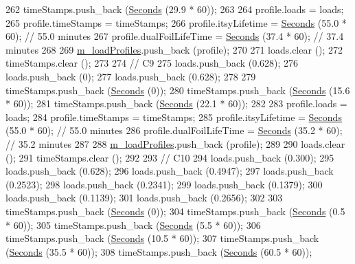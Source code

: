 \begin{DoxyCode}
262   timeStamps.push\_back (\hyperlink{group__timecivil_ga33c34b816f8ff6628e33d5c8e9713b9e}{Seconds} (29.9 * 60));
263 
264   profile.loads = loads;
265   profile.timeStamps = timeStamps;
266   profile.itsyLifetime = \hyperlink{group__timecivil_ga33c34b816f8ff6628e33d5c8e9713b9e}{Seconds} (55.0 * 60);     \textcolor{comment}{// 55.0 minutes}
267   profile.dualFoilLifeTime = \hyperlink{group__timecivil_ga33c34b816f8ff6628e33d5c8e9713b9e}{Seconds} (37.4 * 60); \textcolor{comment}{// 37.4 minutes}
268 
269   \hyperlink{classBatteryLifetimeTest_aee9ad324da18f58ee75689778580c3fb}{m\_loadProfiles}.push\_back (profile);
270 
271   loads.clear ();
272   timeStamps.clear ();
273 
274   \textcolor{comment}{// C9}
275   loads.push\_back (0.628);
276   loads.push\_back (0);
277   loads.push\_back (0.628);
278 
279   timeStamps.push\_back (\hyperlink{group__timecivil_ga33c34b816f8ff6628e33d5c8e9713b9e}{Seconds} (0));
280   timeStamps.push\_back (\hyperlink{group__timecivil_ga33c34b816f8ff6628e33d5c8e9713b9e}{Seconds} (15.6 * 60));
281   timeStamps.push\_back (\hyperlink{group__timecivil_ga33c34b816f8ff6628e33d5c8e9713b9e}{Seconds} (22.1 * 60));
282 
283   profile.loads = loads;
284   profile.timeStamps = timeStamps;
285   profile.itsyLifetime = \hyperlink{group__timecivil_ga33c34b816f8ff6628e33d5c8e9713b9e}{Seconds} (55.0 * 60);     \textcolor{comment}{// 55.0 minutes}
286   profile.dualFoilLifeTime = \hyperlink{group__timecivil_ga33c34b816f8ff6628e33d5c8e9713b9e}{Seconds} (35.2 * 60); \textcolor{comment}{// 35.2 minutes}
287 
288   \hyperlink{classBatteryLifetimeTest_aee9ad324da18f58ee75689778580c3fb}{m\_loadProfiles}.push\_back (profile);
289 
290   loads.clear ();
291   timeStamps.clear ();
292 
293   \textcolor{comment}{// C10}
294   loads.push\_back (0.300);
295   loads.push\_back (0.628);
296   loads.push\_back (0.4947);
297   loads.push\_back (0.2523);
298   loads.push\_back (0.2341);
299   loads.push\_back (0.1379);
300   loads.push\_back (0.1139);
301   loads.push\_back (0.2656);
302 
303   timeStamps.push\_back (\hyperlink{group__timecivil_ga33c34b816f8ff6628e33d5c8e9713b9e}{Seconds} (0));
304   timeStamps.push\_back (\hyperlink{group__timecivil_ga33c34b816f8ff6628e33d5c8e9713b9e}{Seconds} (0.5 * 60));
305   timeStamps.push\_back (\hyperlink{group__timecivil_ga33c34b816f8ff6628e33d5c8e9713b9e}{Seconds} (5.5 * 60));
306   timeStamps.push\_back (\hyperlink{group__timecivil_ga33c34b816f8ff6628e33d5c8e9713b9e}{Seconds} (10.5 * 60));
307   timeStamps.push\_back (\hyperlink{group__timecivil_ga33c34b816f8ff6628e33d5c8e9713b9e}{Seconds} (35.5 * 60));
308   timeStamps.push\_back (\hyperlink{group__timecivil_ga33c34b816f8ff6628e33d5c8e9713b9e}{Seconds} (60.5 * 60));

\end{DoxyCode}
